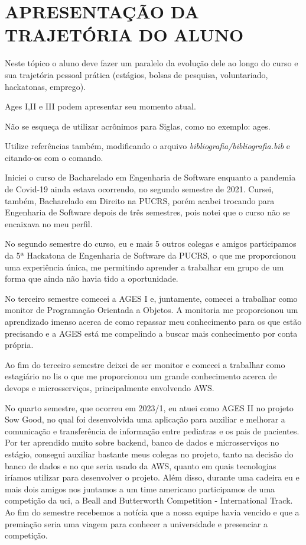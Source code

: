 \chapter[APRESENTAÇÃO DA TRAJETÓRIA DO ALUNO]{APRESENTAÇÃO DA TRAJETÓRIA DO ALUNO}

Neste tópico o aluno deve fazer um paralelo da evolução dele ao longo do curso e sua trajetória pessoal prática (estágios, bolsas de pesquisa, voluntariado, hackatonas, emprego).
  
Ages I,II e III podem apresentar seu momento atual.

Não se esqueça de utilizar acrônimos para Siglas, como no exemplo: \ac{ages}.

Utilize referências também, modificando o arquivo \textit{bibliografia/bibliografia.bib} e citando-os com o comando\cite{artigo}.

Iniciei o curso de Bacharelado em Engenharia de Software enquanto a pandemia de Covid-19 ainda estava ocorrendo, no segundo semestre de 2021. Cursei, também, Bacharelado em Direito na PUCRS, porém acabei trocando para Engenharia de Software depois de três semestres, pois notei que o curso não se encaixava no meu perfil.

No segundo semestre do curso, eu e mais 5 outros colegas e amigos participamos da 5ª Hackatona de Engenharia de Software da PUCRS, o que me proporcionou uma experiência única, me permitindo aprender a trabalhar em grupo de um forma que ainda não havia tido a oportunidade.

No terceiro semestre comecei a AGES I e, juntamente, comecei a trabalhar como monitor de Programação Orientada a Objetos. A monitoria me proporcionou um aprendizado imenso acerca de como repassar meu conhecimento para os que estão precisando e a AGES está me compelindo a buscar mais conhecimento por conta própria.

Ao fim do terceiro semestre deixei de ser monitor e comecei a trabalhar como estagiário no \ac{lis} o que me proporcionou um grande conhecimento acerca de \ac{devops} e microsserviços, principalmente envolvendo AWS.

No quarto semestre, que ocorreu em 2023/1, eu atuei como AGES II no projeto Sow Good, no qual foi desenvolvida uma aplicação para auxiliar e melhorar a comunicação e transferência de informação entre pediatras e os pais de pacientes. Por ter aprendido muito sobre backend, banco de dados e microsserviços no estágio, consegui auxiliar bastante meus colegas no projeto, tanto na decisão do banco de dados e no que seria usado da AWS, quanto em quais tecnologias iríamos utilizar para desenvolver o projeto. Além disso, durante uma cadeira eu e mais dois amigos nos juntamos a um time americano participamos de uma competição da \ac{uci}, a Beall and Butterworth Competition - International Track. Ao fim do semestre recebemos a notícia que a nossa equipe havia vencido e que a premiação seria uma viagem para conhecer a universidade e presenciar a competição.

